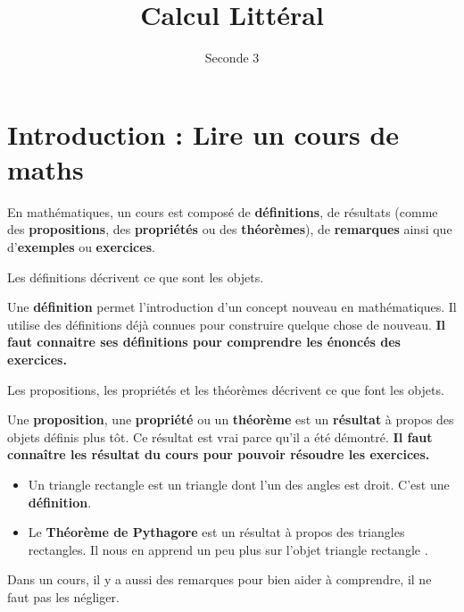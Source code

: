 \documentclass{poly}
\author{Seconde 3}
\date{}
\title{Calcul Littéral}
\begin{document}
\maketitle
\section{Introduction : Lire un cours de maths}
En mathématiques, un cours est composé de \textbf{définitions}, de résultats (comme des \textbf{propositions}, des \textbf{propriétés} ou des \textbf{théorèmes}), de \textbf{remarques} ainsi que d'\textbf{exemples} ou \textbf{exercices}. 

Les définitions décrivent ce que sont les objets.
\begin{tcolorbox}
Une \textbf{définition} permet l'introduction d'un concept nouveau en mathématiques. Il utilise des définitions déjà connues pour construire quelque chose de nouveau.
\tcblower
\textbf{Il faut connaitre ses définitions pour comprendre les énoncés des exercices.}
\end{tcolorbox}
Les propositions, les propriétés et les théorèmes décrivent ce que font les objets.
\begin{tcolorbox}[arc=0mm, colback=black!10]
Une \textbf{proposition}, une \textbf{propriété} ou un \textbf{théorème} est un \textbf{résultat} à propos des objets définis plus tôt. Ce résultat est vrai parce qu'il a été démontré.
\tcblower
\textbf{Il faut connaître les résultat du cours pour pouvoir résoudre les exercices.}
\end{tcolorbox}
\begin{example}
\hfill
\begin{itemize}
\item Un triangle rectangle est un triangle dont l'un des angles est droit. C'est une \textbf{définition}.
\item Le \textbf{Théorème de Pythagore} est un résultat à propos des triangles rectangles. Il nous en apprend un peu plus sur l'objet \og triangle rectangle \fg.
\end{itemize}
\end{example}
\begin{tcolorbox}[colback=white]
Dans un cours, il y a aussi des remarques pour bien aider à comprendre, il ne faut pas les négliger.
\end{tcolorbox}
\end{document}
